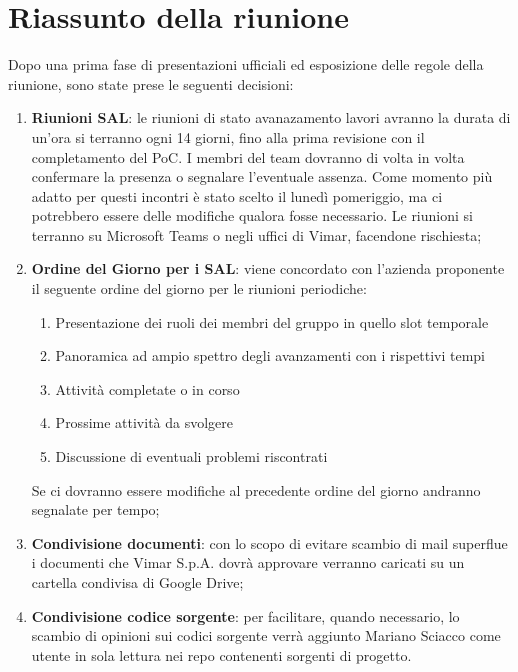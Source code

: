 \section{Riassunto della riunione}
Dopo una prima fase di presentazioni ufficiali ed esposizione delle regole della riunione, sono state prese le seguenti decisioni:
\begin{enumerate}
    \item \textbf{Riunioni SAL}: le riunioni di stato avanazamento lavori avranno la durata di un'ora si terranno ogni 14 giorni, fino alla prima revisione con il completamento del PoC. I membri del team dovranno di volta in volta confermare la presenza o segnalare l'eventuale assenza. Come momento più adatto per questi incontri è stato scelto il lunedì pomeriggio, ma ci potrebbero essere delle modifiche qualora fosse necessario. Le riunioni si terranno su Microsoft Teams o negli uffici di Vimar, facendone rischiesta;
    
    \item \textbf{Ordine del Giorno per i SAL}: viene concordato con l'azienda proponente il seguente ordine del giorno per le riunioni periodiche:
        \begin{enumerate}[label=\Roman* - ]
            \item Presentazione dei ruoli dei membri del gruppo in quello slot temporale
            \item Panoramica ad ampio spettro degli avanzamenti con i rispettivi tempi
            \item Attività completate o in corso 
            \item Prossime attività da svolgere
            \item Discussione di eventuali problemi riscontrati
        \end{enumerate}
    Se ci dovranno essere modifiche al precedente ordine del giorno andranno segnalate per tempo;

    \item \textbf{Condivisione documenti}: con lo scopo di evitare scambio di mail superflue i documenti che Vimar S.p.A. dovrà approvare verranno caricati su un cartella condivisa di Google Drive;

    \item \textbf{Condivisione codice sorgente}: per facilitare, quando necessario, lo scambio di opinioni sui codici sorgente verrà aggiunto Mariano Sciacco come utente in sola lettura nei repo contenenti sorgenti di progetto.

\end{enumerate}

